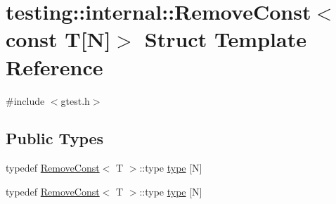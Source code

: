 \hypertarget{structtesting_1_1internal_1_1_remove_const_3_01const_01_t[_n]_4}{\section{testing\-:\-:internal\-:\-:Remove\-Const$<$ const T\mbox{[}N\mbox{]}$>$ Struct Template Reference}
\label{structtesting_1_1internal_1_1_remove_const_3_01const_01_t[_n]_4}
}


{\ttfamily \#include $<$gtest.\-h$>$}

\subsection*{Public Types}
\begin{DoxyCompactItemize}
\item 
typedef \hyperlink{structtesting_1_1internal_1_1_remove_const}{Remove\-Const}$<$ T $>$\-::type \hyperlink{structtesting_1_1internal_1_1_remove_const_3_01const_01_t[_n]_4_ac976b53cb5d031a120fafbe790650068}{type} \mbox{[}N\mbox{]}
\item 
typedef \hyperlink{structtesting_1_1internal_1_1_remove_const}{Remove\-Const}$<$ T $>$\-::type \hyperlink{structtesting_1_1internal_1_1_remove_const_3_01const_01_t[_n]_4_ac976b53cb5d031a120fafbe790650068}{type} \mbox{[}N\mbox{]}
\end{DoxyCompactItemize}


